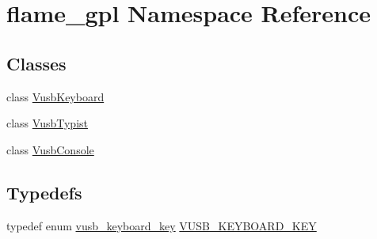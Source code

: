 \hypertarget{namespaceflame__gpl}{\section{flame\-\_\-gpl Namespace Reference}
\label{namespaceflame__gpl}
}
\subsection*{Classes}
\begin{DoxyCompactItemize}
\item 
class \hyperlink{classflame__gpl_1_1_vusb_keyboard}{Vusb\-Keyboard}
\item 
class \hyperlink{classflame__gpl_1_1_vusb_typist}{Vusb\-Typist}
\item 
class \hyperlink{classflame__gpl_1_1_vusb_console}{Vusb\-Console}
\end{DoxyCompactItemize}
\subsection*{Typedefs}
\begin{DoxyCompactItemize}
\item 
typedef enum \hyperlink{namespaceflame__gpl_ac5dd72d2f6257805426f44b0bad032c2}{vusb\-\_\-keyboard\-\_\-key} \hyperlink{namespaceflame__gpl_a40752e4f9e83da1573a3d418e0bd5653}{V\-U\-S\-B\-\_\-\-K\-E\-Y\-B\-O\-A\-R\-D\-\_\-\-K\-E\-Y}
\end{DoxyCompactItemize}
